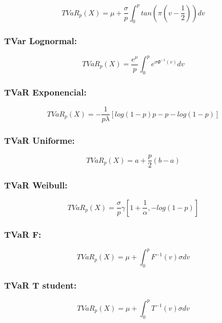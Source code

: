 \documentclass[10pt,]{article}
\begin{document}
\[TVaR_p(X)=\mu+\frac{\sigma}{p}\int_{0}^{p}tan\left(\pi\left(v-\frac{1}{2}\right)\right)dv\]

\hypertarget{tvar-lognormal}{%
\subsubsection{\texorpdfstring{\textbf{TVar
Lognormal:}}{TVar Lognormal:}}\label{tvar-lognormal}}

\[TVaR_p(X)=\frac{e^{\mu}}{p}\int_{0}^{p}e^{\sigma\Phi^{-1}(v)}dv\]

\hypertarget{tvar-exponencial}{%
\subsubsection{\texorpdfstring{\textbf{TVaR
Exponencial:}}{TVaR Exponencial:}}\label{tvar-exponencial}}

\[TVaR_p(X) = -\frac{1}{p\lambda}\left[log(1-p)p-p-log(1-p)\right]\]

\hypertarget{tvar-uniforme}{%
\subsubsection{\texorpdfstring{\textbf{TVaR
Uniforme:}}{TVaR Uniforme:}}\label{tvar-uniforme}}

\[TVaR_p(X) = a+\frac{p}{2}(b-a)\]

\hypertarget{tvar-weibull}{%
\subsubsection{\texorpdfstring{\textbf{TVaR
Weibull:}}{TVaR Weibull:}}\label{tvar-weibull}}

\[TVaR_p(X) = \frac{\sigma}{p}\gamma[1+\frac{1}{\alpha}, -log(1-p)]\]

\hypertarget{tvar-f}{%
\subsubsection{\texorpdfstring{\textbf{TVaR
F:}}{TVaR F:}}\label{tvar-f}}

\[TVaR_p(X) = \mu + \int_{0}^{p}F^{-1}(v)\sigma dv\]

\hypertarget{tvar-t-student}{%
\subsubsection{\texorpdfstring{\textbf{TVaR T
student:}}{TVaR T student:}}\label{tvar-t-student}}

\[TVaR_p(X) = \mu + \int_{0}^{p}T^{-1}(v)\sigma dv\]
\end{document}
